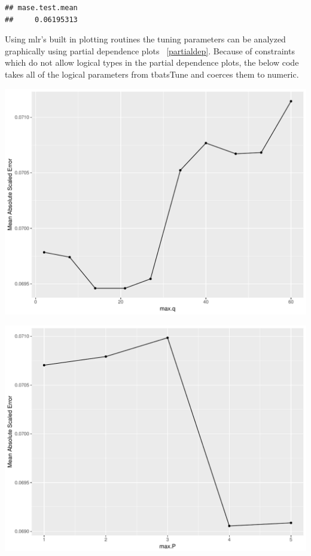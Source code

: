 \documentclass[12pt]{article}\usepackage[]{graphicx}\usepackage[]{color}
\makeatletter
\def\maxwidth{ %
  \ifdim\Gin@nat@width>\linewidth
    \linewidth
  \else
    \Gin@nat@width
  \fi
}
\newenvironment{kframe}{%
 \def\at@end@of@kframe{}%
 \ifinner\ifhmode%
  \def\at@end@of@kframe{\end{minipage}}%
  \begin{minipage}{\columnwidth}%
 \fi\fi%
 \def\FrameCommand##1{\hskip\@totalleftmargin \hskip-\fboxsep
 \colorbox{shadecolor}{##1}\hskip-\fboxsep
     \hskip-\linewidth \hskip-\@totalleftmargin \hskip\columnwidth}%
 \MakeFramed {\advance\hsize-\width
   \@totalleftmargin\z@ \linewidth\hsize
   \@setminipage}}%
 {\par\unskip\endMakeFramed%
 \at@end@of@kframe}
\newenvironment{knitrout}{}{} %
\theoremstyle{definition}
\newcommand\code{\@codex}
\def\@codex#1{{\normalfont\ttfamily\hyphenchar\font=-1 #1}}
\newcommand{\pkg}[1]{{\fontseries{b}\selectfont #1}}
\makeatother
\begin{document}
\begin{knitrout}
\color{fgcolor}\begin{kframe}
\begin{verbatim}
## mase.test.mean 
##     0.06195313
\end{verbatim}
\end{kframe}
\end{knitrout}

Using \pkg{mlr}'s built in plotting routines the tuning parameters can be analyzed graphically using partial dependence plots ~\ref{partialdep}. Because of constraints which do not allow logical types in the partial dependence plots, the below code takes all of the logical parameters from \code{tbatsTune} and coerces them to numeric.

\begin{knitrout}
\color{fgcolor}

{\centering \includegraphics[width=\maxwidth]{figure/loadTuneTbats2-1} 

}




{\centering \includegraphics[width=\maxwidth]{figure/loadTuneTbats2-2} 

}



\end{knitrout}
\doublespacing
\end{document}
